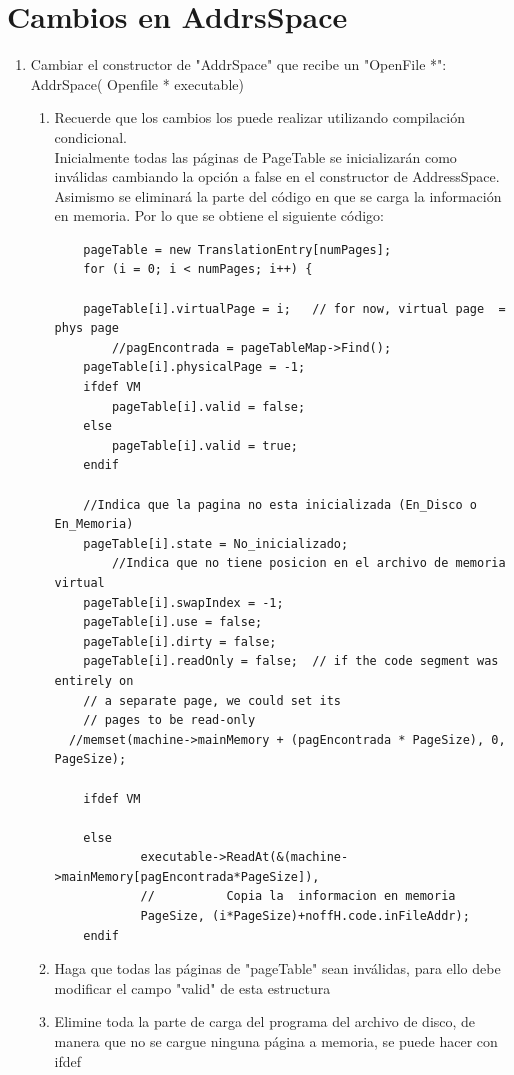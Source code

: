 \documentclass[11pt]{article}
\begin{document}
	\section{Cambios en AddrsSpace}
	\begin{enumerate}
	  \item  Cambiar el constructor de "AddrSpace" que recibe un "OpenFile *": AddrSpace( Openfile * executable) 
	  \begin{enumerate}
	    \item  Recuerde que los cambios los puede realizar utilizando compilación condicional.\\
	    Inicialmente todas las páginas de PageTable se inicializarán como inválidas cambiando la opción a false en el constructor de AddressSpace. Asimismo se eliminará la parte del código en que se carga la información en memoria. Por lo que se obtiene el siguiente código:
	    \begin{lstlisting}
    pageTable = new TranslationEntry[numPages];
    for (i = 0; i < numPages; i++) {

	pageTable[i].virtualPage = i;	// for now, virtual page  = phys page 
        //pagEncontrada = pageTableMap->Find();
	pageTable[i].physicalPage = -1;
	ifdef VM
		pageTable[i].valid = false;
	else
		pageTable[i].valid = true;
	endif
        
	//Indica que la pagina no esta inicializada (En_Disco o En_Memoria)		
	pageTable[i].state = No_inicializado;
        //Indica que no tiene posicion en el archivo de memoria virtual
	pageTable[i].swapIndex = -1;
	pageTable[i].use = false;
	pageTable[i].dirty = false;
	pageTable[i].readOnly = false;  // if the code segment was entirely on 
	// a separate page, we could set its 
	// pages to be read-only
  //memset(machine->mainMemory + (pagEncontrada * PageSize), 0, PageSize);          

	ifdef VM
		
	else
        	executable->ReadAt(&(machine->mainMemory[pagEncontrada*PageSize]), 
        	// 			Copia la  informacion en memoria
        	PageSize, (i*PageSize)+noffH.code.inFileAddr); 
	endif
	    \end{lstlisting}
	    
	    \item  Haga que todas las páginas de "pageTable" sean inválidas, para ello debe modificar el campo "valid" de esta estructura\\
	    
      \item Elimine toda la parte de carga del programa del archivo de disco, de manera que no se cargue ninguna página a memoria, se puede hacer con ifdef\\
      

\end{enumerate}
\end{enumerate}
\end{document}
